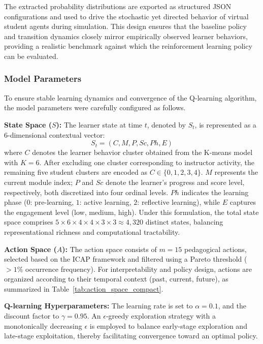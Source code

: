 \documentclass[conference]{IEEEtran}
\begin{document}
The extracted probability distributions are exported as structured JSON configurations and used to drive the stochastic yet directed behavior of virtual student agents during simulation. This design ensures that the baseline policy and transition dynamics closely mirror empirically observed learner behaviors, providing a realistic benchmark against which the reinforcement learning policy can be evaluated.

\subsubsection{Model Parameters}
To ensure stable learning dynamics and convergence of the Q-learning algorithm, the model parameters were carefully configured as follows.

\textbf{State Space ($S$):} The learner state at time $t$, denoted by $S_t$, is represented as a 6-dimensional contextual vector:
\begin{equation}
S_t = (C, M, P, Sc, Ph, E)
\end{equation}
where $C$ denotes the learner behavior cluster obtained from the K-means model with $K=6$. After excluding one cluster corresponding to instructor activity, the remaining five student clusters are encoded as $C \in \{0,1,2,3,4\}$.  
$M$ represents the current module index; $P$ and $Sc$ denote the learner’s progress and score level, respectively, both discretized into four ordinal levels.  
$Ph$ indicates the learning phase ($0$: pre-learning, $1$: active learning, $2$: reflective learning), while $E$ captures the engagement level (low, medium, high).  
Under this formulation, the total state space comprises $5 \times 6 \times 4 \times 4 \times 3 \times 3 \approx 4{,}320$ distinct states, balancing representational richness and computational tractability.

\textbf{Action Space ($A$):} The action space consists of $m=15$ pedagogical actions, selected based on the ICAP framework and filtered using a Pareto threshold ($>1\%$ occurrence frequency). For interpretability and policy design, actions are organized according to their temporal context (past, current, future), as summarized in Table~\ref{tab:action_space_compact}.

\textbf{Q-learning Hyperparameters:} The learning rate is set to $\alpha = 0.1$, and the discount factor to $\gamma = 0.95$. An $\epsilon$-greedy exploration strategy with a monotonically decreasing $\epsilon$ is employed to balance early-stage exploration and late-stage exploitation, thereby facilitating convergence toward an optimal policy.
\end{document}
